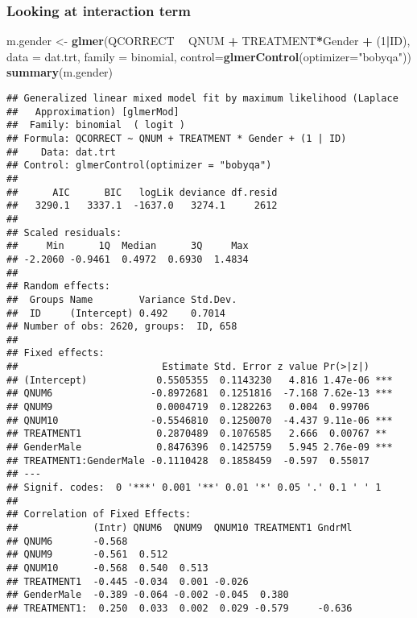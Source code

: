 \documentclass[]{article}
\newenvironment{Shaded}{\begin{snugshade}}{\end{snugshade}}
\newcommand{\KeywordTok}[1]{\textcolor[rgb]{0.13,0.29,0.53}{\textbf{#1}}}
\newcommand{\DataTypeTok}[1]{\textcolor[rgb]{0.13,0.29,0.53}{#1}}
\newcommand{\DecValTok}[1]{\textcolor[rgb]{0.00,0.00,0.81}{#1}}
\newcommand{\StringTok}[1]{\textcolor[rgb]{0.31,0.60,0.02}{#1}}
\newcommand{\OperatorTok}[1]{\textcolor[rgb]{0.81,0.36,0.00}{\textbf{#1}}}
\newcommand{\NormalTok}[1]{#1}
\begin{document}
\subsubsection{Looking at interaction
term}\label{looking-at-interaction-term}

\begin{Shaded}
\begin{Highlighting}[]
\NormalTok{m.gender <-}\StringTok{ }\KeywordTok{glmer}\NormalTok{(QCORRECT }\OperatorTok{~}\StringTok{ }\NormalTok{QNUM }\OperatorTok{+}\StringTok{ }\NormalTok{TREATMENT}\OperatorTok{*}\NormalTok{Gender }\OperatorTok{+}\StringTok{ }\NormalTok{(}\DecValTok{1}\OperatorTok{|}\NormalTok{ID), }
                \DataTypeTok{data =}\NormalTok{ dat.trt, }
                \DataTypeTok{family =}\NormalTok{ binomial, }\DataTypeTok{control=}\KeywordTok{glmerControl}\NormalTok{(}\DataTypeTok{optimizer=}\StringTok{"bobyqa"}\NormalTok{))}
\KeywordTok{summary}\NormalTok{(m.gender)}
\end{Highlighting}
\end{Shaded}

\begin{verbatim}
## Generalized linear mixed model fit by maximum likelihood (Laplace
##   Approximation) [glmerMod]
##  Family: binomial  ( logit )
## Formula: QCORRECT ~ QNUM + TREATMENT * Gender + (1 | ID)
##    Data: dat.trt
## Control: glmerControl(optimizer = "bobyqa")
## 
##      AIC      BIC   logLik deviance df.resid 
##   3290.1   3337.1  -1637.0   3274.1     2612 
## 
## Scaled residuals: 
##     Min      1Q  Median      3Q     Max 
## -2.2060 -0.9461  0.4972  0.6930  1.4834 
## 
## Random effects:
##  Groups Name        Variance Std.Dev.
##  ID     (Intercept) 0.492    0.7014  
## Number of obs: 2620, groups:  ID, 658
## 
## Fixed effects:
##                         Estimate Std. Error z value Pr(>|z|)    
## (Intercept)            0.5505355  0.1143230   4.816 1.47e-06 ***
## QNUM6                 -0.8972681  0.1251816  -7.168 7.62e-13 ***
## QNUM9                  0.0004719  0.1282263   0.004  0.99706    
## QNUM10                -0.5546810  0.1250070  -4.437 9.11e-06 ***
## TREATMENT1             0.2870489  0.1076585   2.666  0.00767 ** 
## GenderMale             0.8476396  0.1425759   5.945 2.76e-09 ***
## TREATMENT1:GenderMale -0.1110428  0.1858459  -0.597  0.55017    
## ---
## Signif. codes:  0 '***' 0.001 '**' 0.01 '*' 0.05 '.' 0.1 ' ' 1
## 
## Correlation of Fixed Effects:
##             (Intr) QNUM6  QNUM9  QNUM10 TREATMENT1 GndrMl
## QNUM6       -0.568                                       
## QNUM9       -0.561  0.512                                
## QNUM10      -0.568  0.540  0.513                         
## TREATMENT1  -0.445 -0.034  0.001 -0.026                  
## GenderMale  -0.389 -0.064 -0.002 -0.045  0.380           
## TREATMENT1:  0.250  0.033  0.002  0.029 -0.579     -0.636
\end{verbatim}
\end{document}
